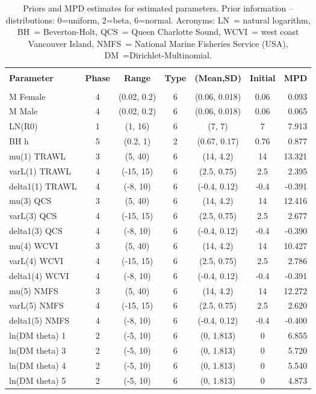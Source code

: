 \newpage
{}

\setlength{\tabcolsep}{2pt}
\begin{table}[!h]
\centering
\caption{Priors and MPD estimates for estimated parameters. Prior information -- distributions: 0=uniform, 2=beta, 6=normal. Acronyms: LN~= natural logarithm, BH~= Beverton-Holt, QCS~= Queen Charlotte Sound, WCVI~= west coast Vancouver Island, NMFS~= National Marine Fisheries Service (USA), DM~=Dirichlet-Multinomial.}
\label{tab:parest}
\usefont{\encodingdefault}{\familydefault}{\seriesdefault}{\shapedefault}\small
\begin{tabular}{lcccccr}
\hline \\ [-1.5ex]
{\bf Parameter} & {\bf Phase} & {\bf Range} & {\bf Type} & {\bf (Mean,SD)} & {\bf Initial} & {\bf MPD} \\ [1ex]
\hline \\ [-1.5ex]
M Female & 4 & (0.02, 0.2) & 6 & (0.06, 0.018) & 0.06 & 0.093 \\
M Male & 4 & (0.02, 0.2) & 6 & (0.06, 0.018) & 0.06 & 0.065 \\
LN(R0) & 1 & (1, 16) & 6 & (7, 7) & 7 & 7.913 \\
BH h & 5 & (0.2, 1) & 2 & (0.67, 0.17) & 0.76 & 0.877 \\
mu(1) TRAWL & 3 & (5, 40) & 6 & (14, 4.2) & 14 & 13.321 \\
varL(1) TRAWL & 4 & (-15, 15) & 6 & (2.5, 0.75) & 2.5 & 2.395 \\
delta1(1) TRAWL & 4 & (-8, 10) & 6 & (-0.4, 0.12) & -0.4 & -0.391 \\
mu(3) QCS & 3 & (5, 40) & 6 & (14, 4.2) & 14 & 12.416 \\
varL(3) QCS & 4 & (-15, 15) & 6 & (2.5, 0.75) & 2.5 & 2.677 \\
delta1(3) QCS & 4 & (-8, 10) & 6 & (-0.4, 0.12) & -0.4 & -0.390 \\
mu(4) WCVI & 3 & (5, 40) & 6 & (14, 4.2) & 14 & 10.427 \\
varL(4) WCVI & 4 & (-15, 15) & 6 & (2.5, 0.75) & 2.5 & 2.786 \\
delta1(4) WCVI & 4 & (-8, 10) & 6 & (-0.4, 0.12) & -0.4 & -0.391 \\
mu(5) NMFS & 3 & (5, 40) & 6 & (14, 4.2) & 14 & 12.272 \\
varL(5) NMFS & 4 & (-15, 15) & 6 & (2.5, 0.75) & 2.5 & 2.620 \\
delta1(5) NMFS & 4 & (-8, 10) & 6 & (-0.4, 0.12) & -0.4 & -0.400 \\
ln(DM theta) 1 & 2 & (-5, 10) & 6 & (0, 1.813) & 0 & 6.855 \\
ln(DM theta) 3 & 2 & (-5, 10) & 6 & (0, 1.813) & 0 & 5.720 \\
ln(DM theta) 4 & 2 & (-5, 10) & 6 & (0, 1.813) & 0 & 5.540 \\
ln(DM theta) 5 & 2 & (-5, 10) & 6 & (0, 1.813) & 0 & 4.873 \\
\hline
\end{tabular}
\usefont{\encodingdefault}{\familydefault}{\seriesdefault}{\shapedefault}\normalsize
\end{table}


